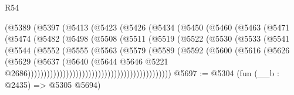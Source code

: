 \begin{lexlean}{R54}
\begin{coremodule}
                          (@5389
                            (@5397
                              (@5413
                                (@5423
                                  (@5426
                                    (@5434
                                      (@5450
                                        (@5460
                                          (@5463
                                            (@5471
                                              (@5474
                                                (@5482
                                                  (@5498
                                                    (@5508
                                                      (@5511
                                                        (@5519
                                                          (@5522
                                                            (@5530
                                                              (@5533
                                                                (@5541
                                                                  (@5544
                                                                    (@5552
                                                                      (@5555
                                                                        (@5563
                                                                          (@5579
                                                                            (@5589
                                                                              (@5592
                                                                                (@5600
                                                                                  (@5616
                                                                                    (@5626
                                                                                      (@5629
                                                                                        (@5637
                                                                                          (@5640
                                                                                            (@5644
                                                                                              @5646
                                                                                              @5221
                                                                                              @2686)))))))))))))))))))))))))))))))))))))))))))))
@5697 := @5304 (fun (__b : @2435) => @5305 @5694)

\end{coremodule}
\end{lexlean}
